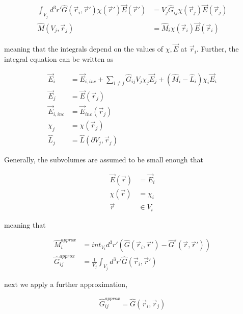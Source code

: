             \begin{align}
                \int_{V_j} d^3 r' \hat{G}(\vec{r}_i,\vec{r}')\chi(\vec{r}')\vec{E}(\vec{r}') &= V_j \hat{G}_{ij}\chi(\vec{r}_j)\vec{E}(\vec{r}_j) \\
                \hat{M}(V_j, \vec{r}_j) &= \hat{M}_i \chi(\vec{r}_i)\vec{E}(\vec{r}_i)
            \end{align}

            meaning that the integrals depend on the values of $\chi, \vec{E}$ at $\vec{r}_i$. Further, the integral equation can be written as

            \begin{align}
                \vec{E}_i &= \vec{E}_{i, inc} + \sum_{i\neq j}\hat{G}_{ij}V_j\chi_j\vec{E}_j + \left(\hat{M}_i -\hat{L}_i\right)\chi_i\vec{E}_i \\
                \vec{E}_j &= \vec{E}(\vec{r}_j) \\
                \vec{E}_{i, inc} &= \vec{E}_{inc}(\vec{r}_j) \\
                \chi_j &= \chi(\vec{r}_j) \\
                \hat{L}_j &= \hat{L}(\partial V_j, \vec{r}_j)
            \end{align}

            Generally, the subvolumes are assumed to be small enough that

            \begin{align}
                \vec{E}(\vec{r}) &= \vec{E}_i \\
                \chi(\vec{r}) &= \chi_i \\
                \vec{r} &\in V_i
            \end{align}

            meaning that

            \begin{align}
                \hat{M}_{i}^{approx} &= int_{V_i}d^3r'\left(\hat{G}(\vec{r}_i, \vec{r}') - \hat{G}^s(\vec{r}, \vec{r}')\right) \\
                \hat{G}_{ij}^{approx} &= \frac{1}{V_j}\int_{V_j}d^3r'\hat{G}(\vec{r}_i, \vec{r}')
            \end{align}

            next we apply a further approximation,

            \begin{align}
                \hat{G}_{ij}^{approx} = \hat{G}(\vec{r}_i, \vec{r}_j)
            \end{align}

